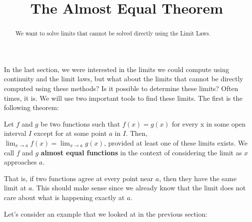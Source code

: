 \documentclass{ximera}
\title{The Almost Equal Theorem}
\begin{document}
\begin{abstract}
  We want to solve limits that cannot be solved directly using the Limit Laws.
\end{abstract}

\maketitle


In the last section, we were interested in the limits we could compute using continuity and the limit laws, but what about the limits that cannot be directly computed using these methods?  Is it possible to determine these limits?  Often times, it is.  We will use two important tools to find these limits.  The first is the following theorem:

\begin{theorem}
Let $f$ and $g$ be two functions such that $f(x)=g(x)$ for every x in some open interval $I$ except for at some point $a$ in $I$.  Then,  $\lim_{x\to a} f(x)= \lim_{x\to a} g(x)$, provided at least one of these limits exists.  We call $f$ and $g$ \textbf{almost equal functions} in the context of considering the limit as $x$ approaches $a$.
\end{theorem}

That is, if two functions agree at every point near $a$, then they have the same limit at $a$.  This should make sense since we already know that the limit does not care about what is happening exactly at $a$.

Let's consider an example that we looked at in the previous section:
\end{document}
